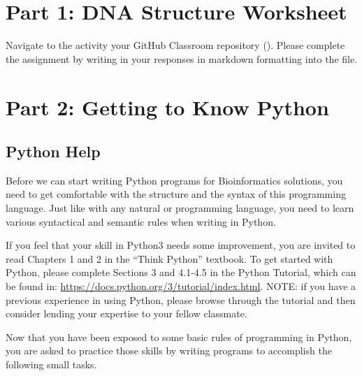 

\vspace*{-.1in}
\section*{Part 1: DNA Structure Worksheet}
\vspace*{-.1in} 
Navigate to the activity your GitHub Classroom repository (\color{red}{\tt activity/activitySheet.md}\color{black}). Please complete the assignment by writing in your responses in markdown formatting into the file.



\vspace*{-.1in}
\section*{Part 2: Getting to Know Python}
\vspace*{-.1in} 

\subsection*{Python Help}
Before we can start writing Python programs for Bioinformatics solutions, you need to get comfortable with the structure and the syntax of this programming language. Just like with any natural or programming language, you need to learn various syntactical and semantic rules when writing in Python.

If you feel that your skill in Python3 needs some improvement, you are invited to read Chapters 1 and 2 in the ``Think Python'' textbook. To get started with Python, please complete Sections 3 and 4.1-4.5 in the Python Tutorial, which can be found in: \url{https://docs.python.org/3/tutorial/index.html}. NOTE: if you have a previous experience in using Python, please browse through the tutorial and then consider lending your expertise to your fellow classmate.

\noindent Now that you have been exposed to some basic rules of programming in Python, you are asked to practice those skills by writing  programs to accomplish the following small tasks.


\vspace*{-.1in}

